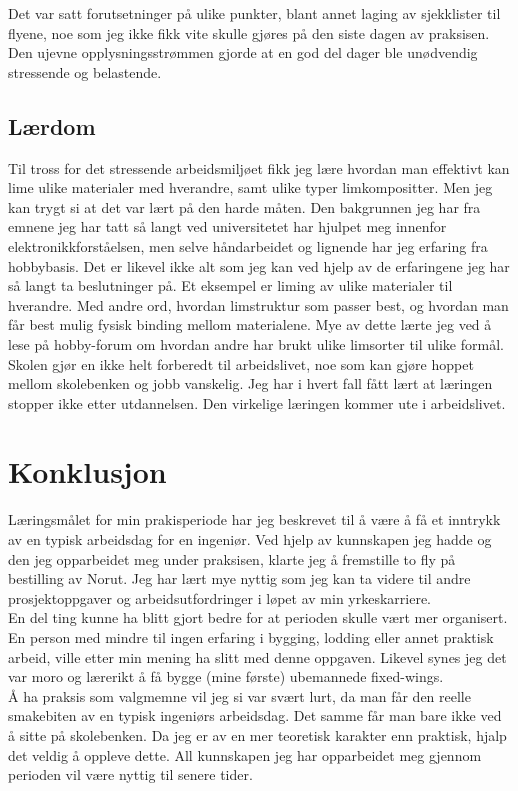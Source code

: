 \documentclass[12pt, a4paper]{article}
\begin{document}
Det var satt forutsetninger på ulike punkter, blant annet laging av sjekklister til flyene, noe som jeg ikke fikk vite skulle gjøres på den siste dagen av praksisen. Den ujevne opplysningsstrømmen gjorde at en god del dager ble unødvendig stressende og belastende. 

\subsection{Lærdom}
Til tross for det stressende arbeidsmiljøet fikk jeg lære hvordan man effektivt kan lime ulike materialer med hverandre, samt ulike typer limkompositter. Men jeg kan trygt si at det var lært på den harde måten. Den bakgrunnen jeg har fra emnene jeg har tatt så langt ved universitetet har hjulpet meg innenfor elektronikkforståelsen, men selve håndarbeidet og lignende har jeg erfaring fra hobbybasis. Det er likevel ikke alt som jeg kan ved hjelp av de erfaringene jeg har så langt ta beslutninger på. Et eksempel er liming av ulike materialer til hverandre. Med andre ord, hvordan limstruktur som passer best, og hvordan man får best mulig fysisk binding mellom materialene. Mye av dette lærte jeg ved å lese på hobby-forum om hvordan andre har brukt ulike limsorter til ulike formål. \\
Skolen gjør en ikke helt forberedt til arbeidslivet, noe som kan gjøre hoppet mellom skolebenken og jobb vanskelig. Jeg har i hvert fall fått lært at læringen stopper ikke etter utdannelsen. Den virkelige læringen kommer ute i arbeidslivet. 

\section{Konklusjon}
Læringsmålet for min prakisperiode har jeg beskrevet til å være å få et inntrykk av en typisk arbeidsdag for en ingeniør. Ved hjelp av kunnskapen jeg hadde og den jeg opparbeidet meg under praksisen, klarte jeg å fremstille to fly på bestilling av Norut. Jeg har lært mye nyttig som jeg kan ta videre til andre prosjektoppgaver og arbeidsutfordringer i løpet av min yrkeskarriere. \\
En del ting kunne ha blitt gjort bedre for at perioden skulle vært mer organisert. En person med mindre til ingen erfaring i bygging, lodding eller annet praktisk arbeid, ville etter min mening ha slitt med denne oppgaven. Likevel synes jeg det var moro og lærerikt å få bygge (mine første) ubemannede fixed-wings. \\
Å ha praksis som valgmemne vil jeg si var svært lurt, da man får den reelle smakebiten av en typisk ingeniørs arbeidsdag. Det samme får man bare ikke ved å sitte på skolebenken. Da jeg er av en mer teoretisk karakter enn praktisk, hjalp det veldig å oppleve dette. All kunnskapen jeg har opparbeidet meg gjennom perioden vil være nyttig til senere tider. 
\end{document}
